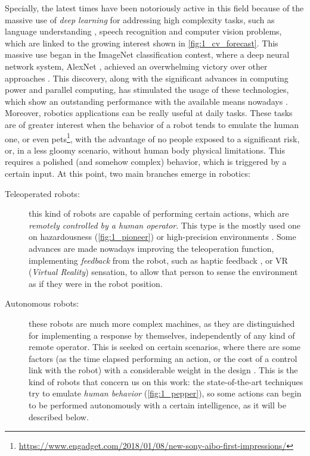 Specially, the latest times have been notoriously active in this field because of the massive use of \textit{deep learning} for addressing high complexity tasks, such as language understanding \cite{gpt2}, speech recognition \cite{speech_neural} and computer vision problems, which are linked to the growing interest shown in \autoref{fig:1_cv_forecast}. This massive use began in the ImageNet classification contest, where a deep neural network system, AlexNet \cite{alexnet}, achieved an overwhelming victory over other approaches \cite{diapos_deep_learning}. This discovery, along with the significant advances in computing power and parallel computing, has stimulated the usage of these technologies, which show an outstanding performance with the available means nowadays \cite{diapos_deep_learning}.\\


Moreover, robotics applications can be really useful at daily tasks. These tasks are of greater interest when the behavior of a robot tends to emulate the human one, or even pets\footnote{\url{https://www.engadget.com/2018/01/08/new-sony-aibo-first-impressions/}}, with the advantage of no people exposed to a significant risk, or, in a less gloomy scenario, without human body physical limitations. This requires a polished (and somehow complex) behavior, which is triggered by a certain input. At this point, two main branches emerge in robotics:
\begin{description}
	\item [Teleoperated robots:] this kind of robots are capable of performing certain actions, which are \textit{remotely controlled by a human operator}. This type is the mostly used one on hazardousness (\autoref{fig:1_pioneer}) \cite{chernobyl-robot} or high-precision environments \cite{teleop-surgery}. Some advances are made nowadays improving the teleoperation function, implementing \textit{feedback} from the robot, such as haptic feedback \cite{teleop-haptic}, or VR (\emph{Virtual Reality}) sensation, to allow that person to sense the environment as if they were in the robot position.
	
	\item [Autonomous robots:] these robots are much more complex machines, as they are distinguished for implementing a response by themselves, independently of any kind of remote operator. This is seeked on certain scenarios, where there are some factors (as the time elapsed performing an action, or the cost of a control link with the robot) with a considerable weight in the design \cite{ai-space}. This is the kind of robots that concern us on this work: the state-of-the-art techniques try to emulate \textit{human behavior} (\autoref{fig:1_pepper}), so some actions can begin to be performed autonomously with a certain intelligence, as it will be described below.
\end{description}


